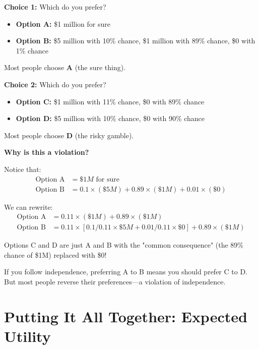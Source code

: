 \documentclass[12pt]{article}
\begin{document}
\begin{tcolorbox}[colback=examplecolor,colframe=blue!75!black,title=The Allais Paradox]
\textbf{Choice 1:} Which do you prefer?
\begin{itemize}
\item \textbf{Option A:} \$1 million for sure
\item \textbf{Option B:} \$5 million with 10\% chance, \$1 million with 89\% chance, \$0 with 1\% chance
\end{itemize}

Most people choose \textbf{A} (the sure thing).

\vspace{0.3cm}

\textbf{Choice 2:} Which do you prefer?
\begin{itemize}
\item \textbf{Option C:} \$1 million with 11\% chance, \$0 with 89\% chance
\item \textbf{Option D:} \$5 million with 10\% chance, \$0 with 90\% chance
\end{itemize}

Most people choose \textbf{D} (the risky gamble).

\vspace{0.3cm}

\textbf{Why is this a violation?}

Notice that:
\begin{align*}
\text{Option A} &= \$1M \text{ for sure} \\
\text{Option B} &= 0.1 \times (\$5M) + 0.89 \times (\$1M) + 0.01 \times (\$0)
\end{align*}

We can rewrite:
\begin{align*}
\text{Option A} &= 0.11 \times (\$1M) + 0.89 \times (\$1M) \\
\text{Option B} &= 0.11 \times [0.1/0.11 \times \$5M + 0.01/0.11 \times \$0] + 0.89 \times (\$1M)
\end{align*}

Options C and D are just A and B with the "common consequence" (the 89\% chance of \$1M) replaced with \$0!

If you follow independence, preferring A to B means you should prefer C to D. But most people reverse their preferences—a violation of independence.
\end{tcolorbox}

\newpage

\section{Putting It All Together: Expected Utility}
\end{document}
